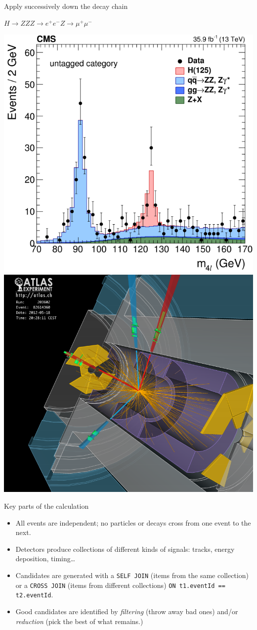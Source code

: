 \documentclass[aspectratio=169]{beamer}
\begin{document}
\begin{frame}{Apply successively down the decay chain}
\Large
\begin{center}
$H \to ZZ$\hspace{1 cm}$Z \to e^+e^-$\hspace{1 cm}$Z \to \mu^+\mu^-$
\end{center}

\includegraphics[height=6 cm]{higgs-to-four-leptons.png}\hfill\includegraphics[height=6 cm]{higgs-to-four-leptons-2.png}
\end{frame}

\begin{frame}{Key parts of the calculation}
\Large
\vspace{0.15 cm}
\begin{itemize}\setlength{\itemsep}{0.25 cm}
\item All events are independent; no particles or decays cross from one event to the next.
\item Detectors produce collections of different kinds of signals: tracks, energy deposition, timing\ldots
\item Candidates are generated with a \texttt{SELF JOIN} (items from the same collection) or a \texttt{CROSS JOIN} (items from different collections) \texttt{ON t1.eventId == t2.eventId}.
\item Good candidates are identified by {\it filtering} (throw away bad ones) and/or {\it reduction} (pick the best of what remains.)
\end{itemize}
\end{frame}
\end{document}
